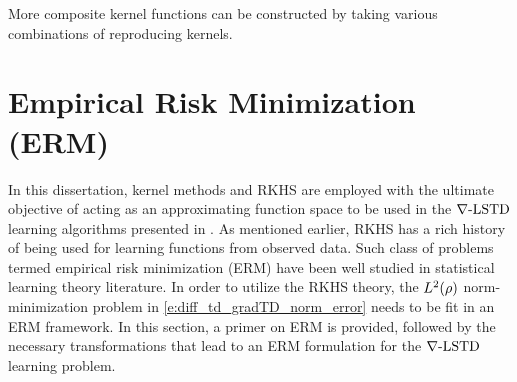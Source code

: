 More composite kernel functions can be constructed by taking various combinations of reproducing kernels. 
\section{Empirical Risk Minimization (ERM)}
\label{s:erm}
In this dissertation, kernel methods and RKHS are employed with the ultimate objective of acting as an approximating function space to be used in the $\nabla\text{-LSTD}$ learning algorithms presented in . As mentioned earlier, RKHS has a rich history of being used for learning functions from observed data. Such class of problems termed empirical risk minimization (ERM) have been well studied in statistical learning theory literature. In order to utilize the RKHS theory, the $L^2(\rho)$ norm-minimization problem in \eqref{e:diff_td_gradTD_norm_error} needs to be fit in an ERM framework. In this section, a primer on ERM is provided, followed by the necessary transformations that lead to an ERM formulation for the $\nabla\text{-LSTD}$ learning problem.  

